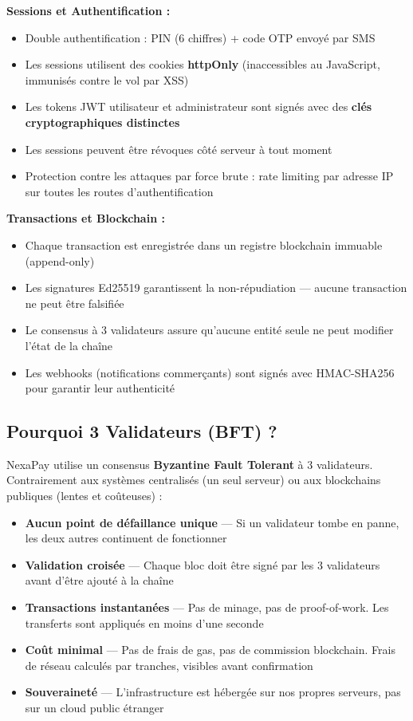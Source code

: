 \documentclass[11pt,a4paper]{article}
\begin{document}
\textbf{Sessions et Authentification :}
\begin{itemize}[leftmargin=*]
    \item Double authentification : PIN (6 chiffres) + code OTP envoy\'e par SMS
    \item Les sessions utilisent des cookies \textbf{httpOnly} (inaccessibles au JavaScript, immunis\'es contre le vol par XSS)
    \item Les tokens JWT utilisateur et administrateur sont sign\'es avec des \textbf{cl\'es cryptographiques distinctes}
    \item Les sessions peuvent \^etre r\'evoques c\^ot\'e serveur \`a tout moment
    \item Protection contre les attaques par force brute : rate limiting par adresse IP sur toutes les routes d'authentification
\end{itemize}

\textbf{Transactions et Blockchain :}
\begin{itemize}[leftmargin=*]
    \item Chaque transaction est enregistr\'ee dans un registre blockchain immuable (append-only)
    \item Les signatures Ed25519 garantissent la non-r\'epudiation --- aucune transaction ne peut \^etre falsifi\'ee
    \item Le consensus \`a 3 validateurs assure qu'aucune entit\'e seule ne peut modifier l'\'etat de la cha\^ine
    \item Les webhooks (notifications commer\c{c}ants) sont sign\'es avec HMAC-SHA256 pour garantir leur authenticit\'e
\end{itemize}

\subsection{Pourquoi 3 Validateurs (BFT) ?}

NexaPay utilise un consensus \textbf{Byzantine Fault Tolerant} \`a 3 validateurs. Contrairement aux syst\`emes centralis\'es (un seul serveur) ou aux blockchains publiques (lentes et co\^uteuses) :

\begin{itemize}[leftmargin=*]
    \item \textbf{Aucun point de d\'efaillance unique} --- Si un validateur tombe en panne, les deux autres continuent de fonctionner
    \item \textbf{Validation crois\'ee} --- Chaque bloc doit \^etre sign\'e par les 3 validateurs avant d'\^etre ajout\'e \`a la cha\^ine
    \item \textbf{Transactions instantan\'ees} --- Pas de minage, pas de proof-of-work. Les transferts sont appliqu\'es en moins d'une seconde
    \item \textbf{Co\^ut minimal} --- Pas de frais de gas, pas de commission blockchain. Frais de r\'eseau calcul\'es par tranches, visibles avant confirmation
    \item \textbf{Souverainet\'e} --- L'infrastructure est h\'eberg\'ee sur nos propres serveurs, pas sur un cloud public \'etranger
\end{itemize}
\end{document}
